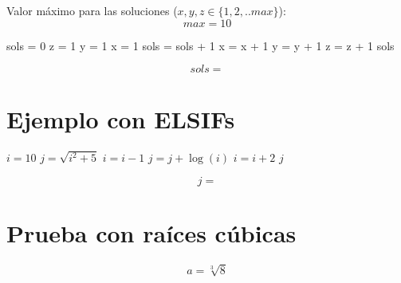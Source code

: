 \documentclass{article}
\begin{document}
Valor máximo para las soluciones ($x, y, z \in \{1,2,..max\}$):
\begin{equation}
max = 10
\label{eq:calc:max}
\end{equation}



\begin{algorithm}
\caption{Número de soluciones}
\label{alg:calc:numsols}
\begin{algorithmic}
    \STATE sols = 0
    \STATE z = 1
        \STATE y = 1
            \STATE x = 1
                    \STATE sols = sols + 1
                \ENDIF
                \STATE x = x + 1
            \ENDWHILE
            \STATE y = y + 1
        \ENDWHILE
        \STATE z = z + 1
    \ENDWHILE
    \RETURN sols
\end{algorithmic}
\end{algorithm}

\begin{equation}
    sols = 
    \label{eq:res:sols}
\end{equation}


\section{Ejemplo con ELSIFs}

\begin{algorithm}
\caption{Ejemplo de un algoritmo con ELSIFs anidados}
\label{alg:calc:Ejemplo con ELSIF}
\begin{algorithmic}
        \STATE $i = 10$
        \STATE $j = \sqrt{i^2 + 5}$
            \STATE $i = i - 1$
                \STATE $j = j + \log(i)$
            \ENDWHILE
            \STATE $i = i + 2$
        \ENDIF
        \RETURN $j$
\end{algorithmic}
\end{algorithm}



\begin{equation}
    j = 
    \label{eq:res:j}
\end{equation}

\section{Prueba con raíces cúbicas}
\begin{equation}
    a = \sqrt[3]{8}
    \label{eq:calc:a}
\end{equation}
\end{document}
